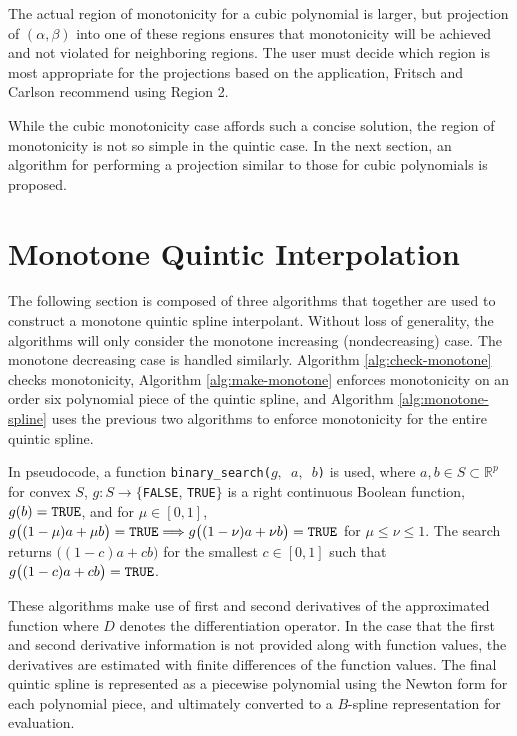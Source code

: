 \documentclass{scspaperproc}
\theoremstyle{scsthe}
\begin{document}
The actual region of monotonicity for a cubic polynomial is larger, but projection of $(\alpha, \beta)$ into one of these regions ensures that monotonicity will be achieved and not violated for neighboring regions. The user must decide which region is most appropriate for the projections based on the application, Fritsch and Carlson recommend using Region 2.

While the cubic monotonicity case affords such a concise solution, the region of monotonicity is not so simple in the quintic case. In the next section, an algorithm for performing a projection similar to those for cubic polynomials is proposed.

\section{Monotone Quintic Interpolation}
\label{sec:monotone-quintic}

The following section is composed of three algorithms that together are used to construct a monotone quintic spline interpolant. Without loss of generality, the algorithms will only consider the monotone increasing (nondecreasing) case. The monotone decreasing case is handled similarly. Algorithm \ref{alg:check-monotone} checks monotonicity,
Algorithm \ref{alg:make-monotone} enforces monotonicity on an order six
polynomial piece of the quintic spline, and Algorithm
\ref{alg:monotone-spline} uses the previous two algorithms to enforce
monotonicity for the entire quintic spline.


In pseudocode, a function \texttt{binary\_search($g,$ $a,$ $b$)} is used, where $a,b\in S\subset \mathbb{R}^p$ for convex $S$, $g: S \rightarrow \{$\texttt{FALSE}, \texttt{TRUE}$\}$ is a right continuous Boolean function, $g(b) = \hbox{\texttt{TRUE}}$, and for $\mu \in [0,1]$, $g\big((1-\mu)a + \mu b\big) =\hbox{\texttt{TRUE}} \Longrightarrow g\big((1-\nu)a + \nu b\big) =\hbox{\texttt{TRUE}}$ for $\mu \le \nu\le1$. The search returns $\big((1-c)a + c b\big)$ for the smallest $c \in [0,1]$ such that $g\big((1-c)a + c b\big) = \hbox{\texttt{TRUE}}$.

These algorithms make use of first and second derivatives of the approximated function where $D$ denotes the differentiation operator. In the case that the first and second derivative information is not provided along with function values, the derivatives are estimated with finite differences of the function values. The final quintic spline is represented as a piecewise polynomial using the Newton form for each polynomial piece, and ultimately converted to a $B$-spline representation for evaluation.
\end{document}
